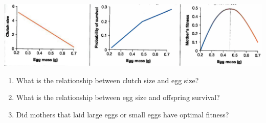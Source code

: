 \begin{frame}[t]
\begin{adjustwidth}{-2em}{-1.5em}
\begin{columns}[t]
        \end{columns}

    \end{adjustwidth}
\end{frame}

\begin{frame}[t]
    \begin{adjustwidth}{-2em}{-1.5em}
        \includegraphics[width=\linewidth]{uta-egg-mass.png}

        \begin{enumerate}
            \item What is the relationship between clutch size and egg size?


                \vspace{5mm}
            \item What is the relationship between egg size and offspring
                survival?


                \vspace{5mm}
            \item Did mothers that laid large eggs or small eggs have optimal
                fitness?

        \end{enumerate}
    \end{adjustwidth}
\end{frame}

